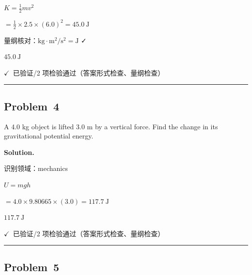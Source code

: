 \documentclass[12pt, a4paper]{article}
\newcommand{\problem}[1]{\subsection*{Problem~#1}}
\newcommand{\solution}{%
  \par\noindent
  {\color{solutiongreen}\bfseries Solution.}\par
}
\newcommand{\verifyok}{\textcolor{solutiongreen}{\ensuremath{\checkmark}\ 已验证}}
\begin{document}
\begin{stepbox}
$K = \frac{1}{2}mv^2$
\end{stepbox}

\begin{stepbox}
$= \frac{1}{2}\times2.5\times(6.0)^2 = 45.0\ \mathrm{J}$
\end{stepbox}

\begin{stepbox}
量纲核对：$\mathrm{kg}\cdot\mathrm{m^2/s^2} = \mathrm{J}$ ✓
\end{stepbox}

\begin{center}
$\boxed{45.0\ \mathrm{J}}$
\end{center}

\begin{verifybox}\small \verifyok{}/2 项检验通过（答案形式检查、量纲检查） \end{verifybox}

\vspace{0.8em}\hrule\vspace{0.8em}

\problem{4}

\begin{stepbox}
A 4.0 kg object is lifted 3.0 m by a vertical force. Find the change in
its gravitational potential energy.
\end{stepbox}

\solution

\begin{stepbox}
识别领域：mechanics
\end{stepbox}

\begin{stepbox}
$U = mgh$
\end{stepbox}

\begin{stepbox}
$= 4.0\times9.80665\times(3.0) = 117.7\ \mathrm{J}$
\end{stepbox}

\begin{center}
$\boxed{117.7\ \mathrm{J}}$
\end{center}

\begin{verifybox}\small \verifyok{}/2 项检验通过（答案形式检查、量纲检查） \end{verifybox}

\vspace{0.8em}\hrule\vspace{0.8em}

\problem{5}
\end{document}
